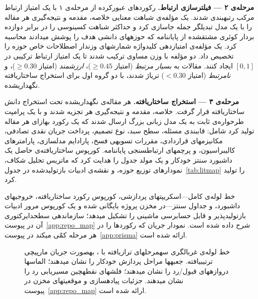 \medskip
\textbf{مرحله‌ی ۲ --- فیلترسازی ارتباط.}\;
رکوردهای عبورکرده از مرحله‌ی ۱ با یک امتیاز ارتباط مرکب رتبه\zwnj{}بندی شدند.
یک مؤلفه‌ی شباهت معنایی خلاصه، مقدمه و نتیجه‌گیری هر مقاله را
با یک مدل تبدیل\zwnj{}گر جمله جاسازی کرد و
حداکثر شباهت کسینوسی را در برابر دوازده بردار کوئری مشتق\zwnj{}شده از پایان\zwnj{}نامه
که حوزه\zwnj{}های دانشی هدف را پوشش می\zwnj{}دادند محاسبه کرد.
یک مؤلفه‌ی امتیازدهی کلیدواژه شمارش\zwnj{}های وزن\zwnj{}دار اصطلاحات خاص حوزه
را تخصیص داد.
دو مؤلفه با وزن مساوی ترکیب شدند تا یک امتیاز ارتباط ترکیبی
در $[0,1]$ ایجاد کنند.
مقالات به \emph{بسیار مرتبط} (امتیاز $\geq 0.45$)،
\emph{ارزشمند} (امتیاز $\geq 0.30$)،
و \emph{نامرتبط} (امتیاز $< 0.30$) تریاژ شدند،
با دو گروه اول برای استخراج ساختاریافته نگه\zwnj{}داری\zwnj{}شده.

\medskip
\textbf{مرحله‌ی ۳ --- استخراج ساختاریافته.}\;
هر مقاله‌ی نگه\zwnj{}داری\zwnj{}شده تحت استخراج دانش ساختاریافته قرار گرفت.
خلاصه، مقدمه و نتیجه‌گیری هر  تجزیه شدند
و با یک پرامپت طرح\zwnj{}واره‌ی ثابت به یک مدل زبانی بزرگ ارسال شدند
که یک رکورد به\zwnj{}ازای هر مقاله تولید کرد شامل:
قاب\zwnj{}بندی مسئله، سطح سبد، نوع تصمیم،
پرداخت جریان نقدی تصادفی، مکانیزم\zwnj{}های قراردادی،
مقررات تسویه\zwnj{}ی فسخ، پارادایم مدل\zwnj{}سازی،
پارامترهای کالیبراسیون، و پرچم\zwnj{}های ارتباط\zwnj{}سنجی پایان\zwnj{}نامه.
کورپوس ساختاریافته‌ی حاصل یک داشبورد سنتز خودکار و
یک مولد جدول را هدایت کرد که ماتریس تحلیل شکاف،
نمودارهای توزیع حوزه، و نقشه‌ی ادبیات بازتولیدشده در
جدول~\ref{tab:litmap} را تولید کرد.

\medskip
خط لوله‌ی کامل---اسکریپت\zwnj{}های پردازشی، کورپوس رکورد ساختاریافته،
خروجی\zwnj{}های داشبورد، و جداول سنتز---در مخزن پروژه بایگانی شده
و یک کورپوس مرور ادبیات بازتولیدپذیر و قابل حسابرسی ماشینی
را تشکیل می\zwnj{}دهد؛ سازماندهی سطح\zwnj{}دایرکتوری آن در
پیوست~\ref{app:repo_map} شرح داده شده است.
نمودار جریان  که رکوردها را در هر مرحله کمّی می\zwnj{}کند
در پیوست~\ref{app:prisma} ارائه شده است.

\begin{figure}[htbp]
    \centering
    
    \caption{خط لوله‌ی غربالگری سه\zwnj{}مرحله\zwnj{}ای تراز\zwnj{}یافته با ،
      به\zwnj{}صورت جریان مارپیچی ترتیب\zwnj{}یافته.
      جعبه\zwnj{}ها مراحل پردازش خودکار را نشان می\zwnj{}دهند؛
      الماس\zwnj{}ها دروازه\zwnj{}های قبول/رد را نشان می\zwnj{}دهند؛
      فلش\zwnj{}های نقطه\zwnj{}چین مسیریابی رد را نشان می\zwnj{}دهند.
      جزئیات پیاده\zwnj{}سازی و موقعیت\zwnj{}های مخزن در
      پیوست~\ref{app:repo_map} ارائه شده است.}
    \label{fig:screening_pipeline}
\end{figure}

